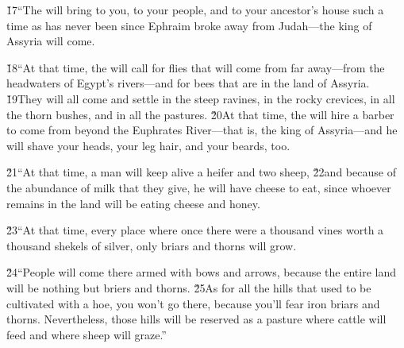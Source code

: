 \v{17}``The  will bring to you, to your people, and to your ancestor's house such a time as has never been since Ephraim broke away from Judah---the king of Assyria will come.

\v{18}``At that time, the  will call for flies that will come from far away---from the headwaters of Egypt's rivers---and for bees that are in the land of Assyria. \v{19}They will all come and settle in the steep ravines, in the rocky crevices, in all the thorn bushes, and in all the pastures. \v{20}At that time, the  will hire a barber to come from beyond the Euphrates River---that is, the king of Assyria---and he will shave your heads, your leg hair, and your beards, too.

\v{21}``At that time, a man will keep alive a heifer and two sheep, \v{22}and because of the abundance of milk that they give, he will have cheese to eat, since whoever remains in the land will be eating cheese and honey.

\v{23}``At that time, every place where once there were a thousand vines worth a thousand shekels of silver, only briars and thorns will grow.

\v{24}``People will come there armed with bows and arrows, because the entire land will be nothing but briers and thorns. \v{25}As for all the hills that used to be cultivated with a hoe, you won't go there, because you'll fear iron briars and thorns. Nevertheless, those hills will be reserved as a pasture where cattle will feed and where sheep will graze.''

